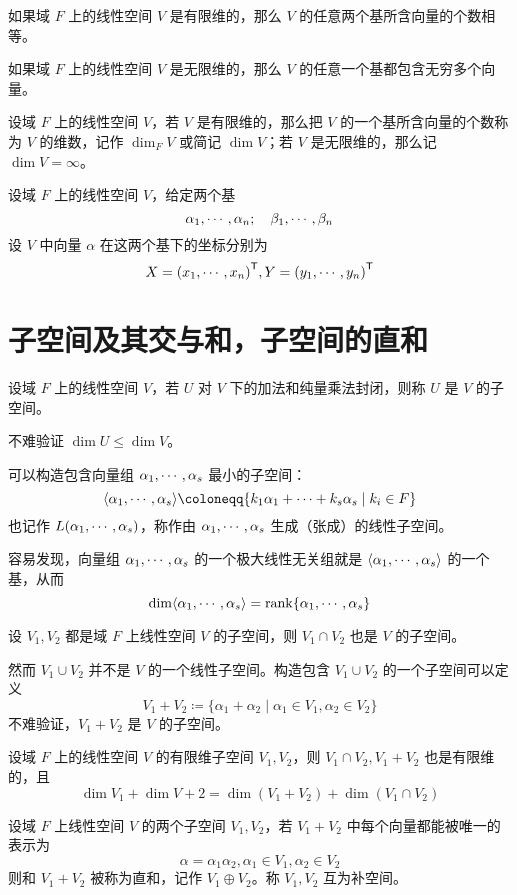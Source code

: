 如果域 $F$ 上的线性空间 $V$ 是有限维的，那么 $V$ 的任意两个基所含向量的个数相等。

如果域 $F$ 上的线性空间 $V$ 是无限维的，那么 $V$ 的任意一个基都包含无穷多个向量。

\begin{definition}
	设域 $F$ 上的线性空间 $V$，若 $V$ 是有限维的，那么把 $V$ 的一个基所含向量的个数称为 $V$ 的维数，记作 $\dim_{F} V$ 或简记 $\dim V$；若 $V$ 是无限维的，那么记 $\dim V = \infty$。
\end{definition}

设域 $F$ 上的线性空间 $V$，给定两个基
\[ \alpha_1,\cdots,\alpha_n; \quad \beta_1,\cdots,\beta_n \]
设 $V$ 中向量 $\alpha$ 在这两个基下的坐标分别为
\[ X = {(x_1,\cdots,x_n)}^\mathsf{T}, Y = {(y_1,\cdots,y_n)}^\mathsf{T} \]

\section{子空间及其交与和，子空间的直和}

设域 $F$ 上的线性空间 $V$，若 $U$ 对 $V$ 下的加法和纯量乘法封闭，则称 $U$ 是 $V$ 的子空间。

不难验证 $\dim U \leqslant \dim V$。

可以构造包含向量组 $\alpha_1,\cdots,\alpha_s$ 最小的子空间：
\[ \langle \seq{\alpha}{s} \rangle \coloneqq \{ k_1\alpha_1+\cdots+k_s\alpha_s \mid k_i\in F \} \]
也记作 $L(\alpha_1,\cdots,\alpha_s)$，称作由 $\alpha_1,\cdots,\alpha_s$ 生成（张成）的线性子空间。

容易发现，向量组 $\alpha_1,\cdots,\alpha_s$ 的一个极大线性无关组就是 $\langle \alpha_1,\cdots,\alpha_s \rangle$ 的一个基，从而
\[ \dim \langle \alpha_1,\cdots,\alpha_s \rangle = \operatorname{rank} \{ \alpha_1,\cdots,\alpha_s \}\]

\begin{theorem}
	设 $V_1,V_2$ 都是域 $F$ 上线性空间 $V$ 的子空间，则 $V_1 \cap V_2$ 也是 $V$ 的子空间。
\end{theorem}

然而 $V_1 \cup V_2$ 并不是 $V$ 的一个线性子空间。构造包含 $V_1 \cup V_2$ 的一个子空间可以定义
\[ V_1+V_2 \coloneqq \{ \alpha_1+\alpha_2 \mid \alpha_1\in V_1, \alpha_2\in V_2 \} \]
不难验证，$V_1+V_2$ 是 $V$ 的子空间。

\begin{theorem}
	设域 $F$ 上的线性空间 $V$ 的有限维子空间 $V_1,V_2$，则 $V_1 \cap V_2, V_1+V_2$ 也是有限维的，且
	\[ \dim V_1 + \dim V+2 = \dim(V_1+V_2) + \dim(V_1 \cap V_2) \]
\end{theorem}

\begin{definition}[直和]
	设域 $F$ 上线性空间 $V$ 的两个子空间 $V_1,V_2$，若 $V_1+V_2$ 中每个向量都能被唯一的表示为
	\[ \alpha = \alpha_1 \alpha_2, \alpha_1 \in V_1, \alpha_2 \in V_2 \]
	则和 $V_1+V_2$ 被称为直和，记作 $V_1 \oplus V_2$。称 $V_1,V_2$ 互为补空间。 
\end{definition}

